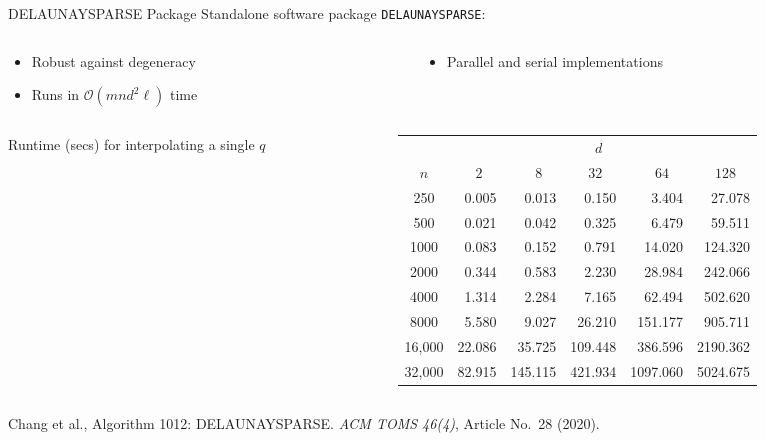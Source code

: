 \documentclass[aspectratio=169]{beamer}
\begin{document}
\begin{frame}{DELAUNAYSPARSE Package}
Standalone software package {\tt DELAUNAYSPARSE}:
\begin{columns}
\begin{column}{.5\textwidth}
\begin{itemize}
\item Robust against degeneracy
\item Runs in $\mathcal{O}(m n d^2 \ell)$ time
\end{itemize}
\end{column}
\begin{column}{.5\textwidth}
\begin{itemize}
\item Parallel and serial implementations
\end{itemize}
\end{column}
\end{columns}
\begin{columns}
\begin{column}{.15\textwidth}
Runtime (secs) for interpolating a single $q$
\end{column}
\begin{column}{.8\textwidth}
{\small
\begin{center}
\begin{tabular}{c|rrrrr}
& & & $d\quad$ & & \\
$n$ & $2\quad$ & $8\quad$ & $32\quad$ & $64\quad$ & $128\quad$ \\
\hline
250    & 0.005  & 0.013   & 0.150   & 3.404    & 27.078   \\
500    & 0.021  & 0.042   & 0.325   & 6.479    & 59.511   \\
1000   & 0.083  & 0.152   & 0.791   & 14.020   & 124.320  \\
2000   & 0.344  & 0.583   & 2.230   & 28.984   & 242.066  \\
4000   & 1.314  & 2.284   & 7.165   & 62.494   & 502.620  \\
8000   & 5.580  & 9.027   & 26.210  & 151.177  & 905.711  \\
16,000 & 22.086 & 35.725  & 109.448 & 386.596  & 2190.362 \\
32,000 & 82.915 & 145.115 & 421.934 & 1097.060 & 5024.675 \\
\end{tabular}
\end{center}
}
\end{column}
\end{columns}
\vfill
{\tiny Chang et al.,
Algorithm 1012: DELAUNAYSPARSE.
{\sl ACM TOMS 46(4)}, Article No.~28 (2020).}
\end{frame}
\end{document}
